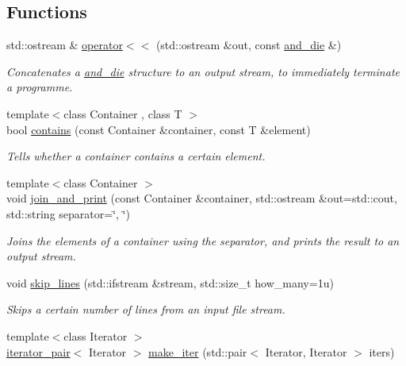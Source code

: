 \subsection*{Functions}
\begin{DoxyCompactItemize}
\item 
std\+::ostream \& \hyperlink{namespaceas_a4d891ae352512e1c506d6cd01ff1422c}{operator$<$$<$} (std\+::ostream \&out, const \hyperlink{structas_1_1and__die}{and\+\_\+die} \&)
\begin{DoxyCompactList}\small\item\em Concatenates a \hyperlink{structas_1_1and__die}{and\+\_\+die} structure to an output stream, to immediately terminate a programme. \end{DoxyCompactList}\item 
{\footnotesize template$<$class Container , class T $>$ }\\bool \hyperlink{namespaceas_a49cf7ae4239ab51e54f099d30a84811a}{contains} (const Container \&container, const T \&element)
\begin{DoxyCompactList}\small\item\em Tells whether a container contains a certain element. \end{DoxyCompactList}\item 
{\footnotesize template$<$class Container $>$ }\\void \hyperlink{namespaceas_aab6569c28591bebed9bd29b40c772bfc}{join\+\_\+and\+\_\+print} (const Container \&container, std\+::ostream \&out=std\+::cout, std\+::string separator=\char`\"{}, \char`\"{})
\begin{DoxyCompactList}\small\item\em Joins the elements of a container using the separator, and prints the result to an output stream. \end{DoxyCompactList}\item 
void \hyperlink{namespaceas_a359f2d209e5ec052ec0d2752a589802d}{skip\+\_\+lines} (std\+::ifstream \&stream, std\+::size\+\_\+t how\+\_\+many=1u)
\begin{DoxyCompactList}\small\item\em Skips a certain number of lines from an input file stream. \end{DoxyCompactList}\item 
{\footnotesize template$<$class Iterator $>$ }\\\hyperlink{classas_1_1iterator__pair}{iterator\+\_\+pair}$<$ Iterator $>$ \hyperlink{namespaceas_a4d4e0fb99b7cc564adaa85b693392070}{make\+\_\+iter} (std\+::pair$<$ Iterator, Iterator $>$ iters)

\end{DoxyCompactItemize}
